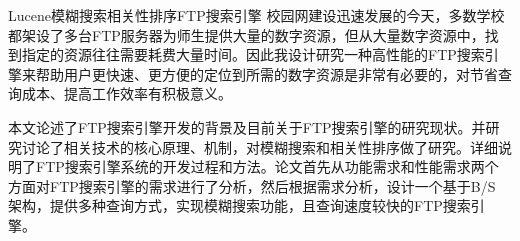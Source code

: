 
\begin{Cabstract}{Lucene}{模糊搜索}{相关性排序}{FTP搜索引擎}{}
校园网建设迅速发展的今天，多数学校都架设了多台FTP服务器为师生提供大量的数字资源，但从大量数字资源中，找到指定的资源往往需要耗费大量时间。因此我设计研究一种高性能的FTP搜索引擎来帮助用户更快速、更方便的定位到所需的数字资源是非常有必要的，对节省查询成本、提高工作效率有积极意义。

本文论述了FTP搜索引擎开发的背景及目前关于FTP搜索引擎的研究现状。并研究讨论了相关技术的核心原理、机制，对模糊搜索和相关性排序做了研究。详细说明了FTP搜索引擎系统的开发过程和方法。论文首先从功能需求和性能需求两个方面对FTP搜索引擎的需求进行了分析，然后根据需求分析，设计一个基于B/S\\架构，提供多种查询方式，实现模糊搜索功能，且查询速度较快的FTP搜索引擎。

\end{Cabstract}
